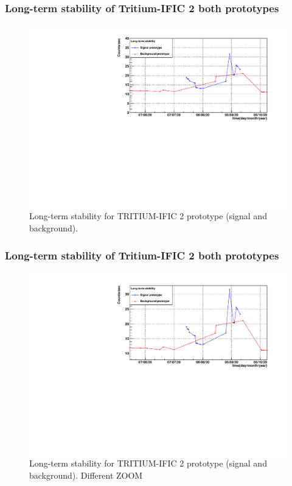 \documentclass{beamer}
\begin{document}
\begin{frame}
\frametitle{Long-term stability of Tritium-IFIC 2 both prototypes}

\begin{figure}[hbtp]
\centering
\includegraphics[scale=0.6]{Imagenes/3Long-term_Stability/Both_plots.pdf}
\caption{Long-term stability for TRITIUM-IFIC 2 prototype (signal and background).}
\end{figure}

\end{frame}

\begin{frame}
\frametitle{Long-term stability of Tritium-IFIC 2 both prototypes}

\begin{figure}[hbtp]
\centering
\includegraphics[scale=0.6]{Imagenes/3Long-term_Stability/Both_plots_ZOOM.pdf}
\caption{Long-term stability for TRITIUM-IFIC 2 prototype (signal and background). Different ZOOM}
\end{figure}

\end{frame}
\end{document}
